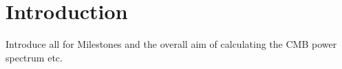 \section*{Introduction}\label{sec:introduction}

Introduce all for Milestones and the overall aim of calculating the CMB power spectrum etc. 

